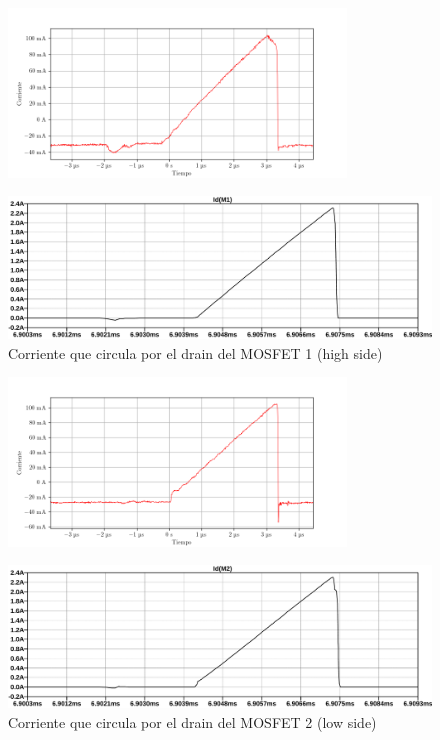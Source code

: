 \begin{figure}[H]
    \centering
    \includegraphics[width=0.8\textwidth]{images/capturas-osciloscopio/17-11-2022/20.png}
    \caption{}
    \label{fig:osc:20}
\end{figure}

\begin{figure}[H]
    \centering
    \includegraphics[width=\textwidth]{images/sim/10.pdf}
    \caption{Corriente que circula por el drain del MOSFET 1 (high side)}
    \label{fig:sim:10}
\end{figure}

\begin{figure}[H]
    \centering
    \includegraphics[width=0.8\textwidth]{images/capturas-osciloscopio/17-11-2022/22.png}
    \caption{}
    \label{fig:osc:22}
\end{figure}

\begin{figure}[H]
    \centering
    \includegraphics[width=\textwidth]{images/sim/11.pdf}
    \caption{Corriente que circula por el drain del MOSFET 2 (low side)}
    \label{fig:sim:11}
\end{figure}

